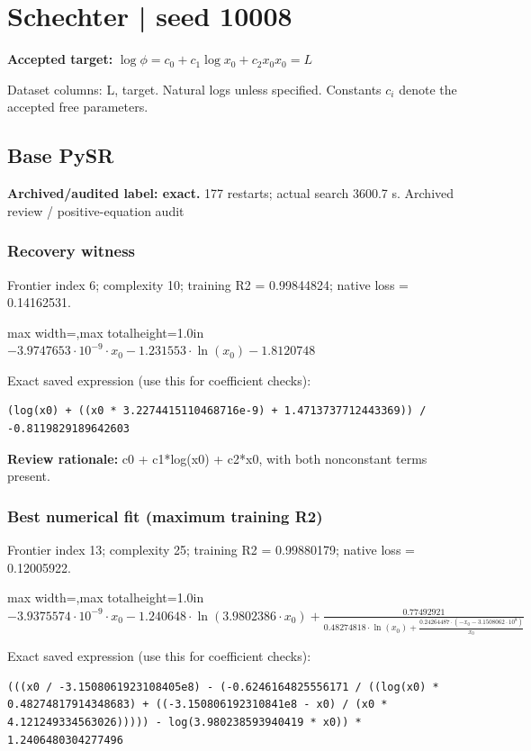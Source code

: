 \documentclass[10pt,letterpaper,landscape]{article}
\begin{document}
\section*{Schechter | seed 10008}
\textbf{Accepted target:} $\displaystyle \log\phi=c_0+c_1\log x_0+c_2x_0$\hfill $x_0=L$\par
{\small Dataset columns: L, target. Natural logs unless specified. Constants $c_i$ denote the accepted free parameters.}\par\medskip
\begin{minipage}[t]{0.485\textwidth}
\subsection*{Base PySR}
\textbf{Archived/audited label: exact.} 177 restarts; actual search 3600.7 s.
{\small Archived review / positive-equation audit}
\subsubsection*{Recovery witness}
Frontier index 6; complexity 10; training R2 = 0.99844824; native loss = 0.14162531.
\begin{center}\begin{adjustbox}{max width=\linewidth,max totalheight=1.0in}$\displaystyle - 3.9747653 \cdot 10^{-9} \cdot x_{0} - 1.231553 \cdot \ln{\left(x_{0} \right)} - 1.8120748$\end{adjustbox}\end{center}
{\scriptsize Exact saved expression (use this for coefficient checks):}
\begin{lstlisting}
(log(x0) + ((x0 * 3.2274415110468716e-9) + 1.4713737712443369)) / -0.8119829189642603
\end{lstlisting}
{\small\textbf{Review rationale:} c0 + c1*log(x0) + c2*x0, with both nonconstant terms present.}
\subsubsection*{Best numerical fit (maximum training R2)}
Frontier index 13; complexity 25; training R2 = 0.99880179; native loss = 0.12005922.
\begin{center}\begin{adjustbox}{max width=\linewidth,max totalheight=1.0in}$\displaystyle - 3.9375574 \cdot 10^{-9} \cdot x_{0} - 1.240648 \cdot \ln{\left(3.9802386 \cdot x_{0} \right)} + \frac{0.77492921}{0.48274818 \cdot \ln{\left(x_{0} \right)} + \frac{0.24264487 \cdot \left(- x_{0} - 3.1508062 \cdot 10^{8}\right)}{x_{0}}}$\end{adjustbox}\end{center}
{\scriptsize Exact saved expression (use this for coefficient checks):}
\begin{lstlisting}
(((x0 / -3.1508061923108405e8) - (-0.6246164825556171 / ((log(x0) * 0.48274817914348683) + ((-3.150806192310841e8 - x0) / (x0 * 4.121249334563026))))) - log(3.980238593940419 * x0)) * 1.2406480304277496
\end{lstlisting}
\end{minipage}\hfill
\end{document}
